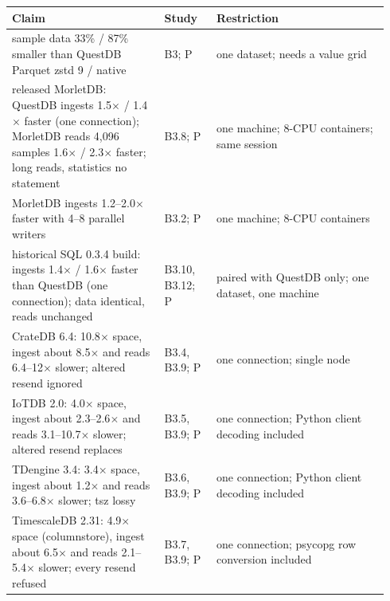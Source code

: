 \documentclass[sigconf]{acmart}
\newcommand{\M}{MorletDB}
\begin{document}
\medskip\noindent
\begin{longtable}{@{}>{\raggedright\arraybackslash}p{0.38\linewidth}p{0.13\linewidth}>{\raggedright\arraybackslash}p{0.43\linewidth}@{}}
\toprule
Claim & Study & Restriction \\
\midrule\endhead
sample data 33\% / 87\% smaller than QuestDB Parquet zstd 9 / native & B3; P & one dataset; needs a value grid \\
released \M{}: QuestDB ingests 1.5$\times$ / 1.4$\times$ faster (one connection); \M{} reads 4,096 samples 1.6$\times$ / 2.3$\times$ faster; long reads, statistics no statement & B3.8; P & one machine; 8-CPU containers; same session \\
\M{} ingests 1.2--2.0$\times$ faster with 4--8 parallel writers & B3.2; P & one machine; 8-CPU containers \\
historical SQL 0.3.4 build: ingests 1.4$\times$ / 1.6$\times$ faster than QuestDB (one connection); data identical, reads unchanged & B3.10, B3.12; P & paired with QuestDB only; one dataset, one machine \\
CrateDB 6.4: 10.8$\times$ space, ingest about 8.5$\times$ and reads 6.4--12$\times$ slower; altered resend ignored & B3.4, B3.9; P & one connection; single node \\
IoTDB 2.0: 4.0$\times$ space, ingest about 2.3--2.6$\times$ and reads 3.1--10.7$\times$ slower; altered resend replaces & B3.5, B3.9; P & one connection; Python client decoding included \\
TDengine 3.4: 3.4$\times$ space, ingest about 1.2$\times$ and reads 3.6--6.8$\times$ slower; tsz lossy & B3.6, B3.9; P & one connection; Python client decoding included \\
TimescaleDB 2.31: 4.9$\times$ space (columnstore), ingest about 6.5$\times$ and reads 2.1--5.4$\times$ slower; every resend refused & B3.7, B3.9; P & one connection; psycopg row conversion included \\
\bottomrule
\end{longtable}
\end{document}
